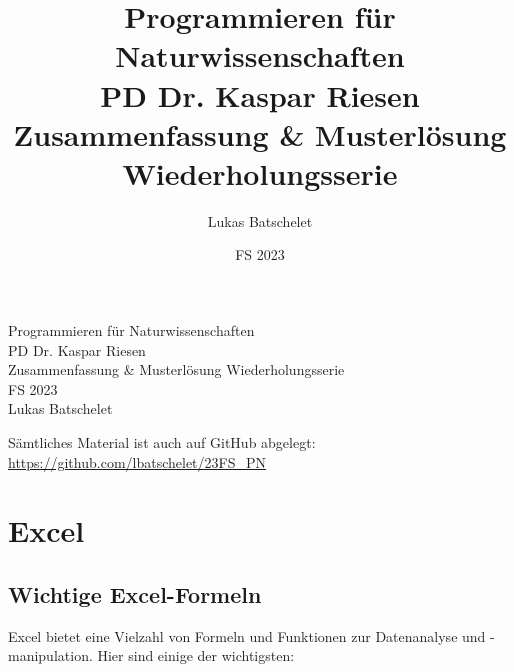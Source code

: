 \documentclass[11pt, oneside]{book}
\title{\sffamily Programmieren für Naturwissenschaften\\ \large PD Dr. Kaspar Riesen\\ \LARGE Zusammenfassung \& Musterlösung Wiederholungsserie}
\author{\sffamily Lukas Batschelet}
\date{\sffamily FS 2023}
\newcommand{\github}[1]{%
   \href{#1}{\faGithubSquare}%
}
\begin{document}
\begin{titlepage}
    \begin{center}
        {\LARGE Programmieren für Naturwissenschaften}\\[0.5cm]
        {\large PD Dr. Kaspar Riesen}\\[0.3cm]
        {\LARGE Zusammenfassung \& Musterlösung Wiederholungsserie}\\[0.5cm]
        {\large FS 2023}\\[2cm]
        {\large Lukas Batschelet}\\[0.3cm]
    \end{center}
    \vfill %
    \noindent \github{https://github.com/lbatschelet/23FS_PN} Sämtliches Material ist auch auf GitHub abgelegt: \href{https://github.com/lbatschelet/23FS_PN}{https://github.com/lbatschelet/23FS\_PN}
    \doclicenseThis
\end{titlepage}

\tableofcontents

\chapter{Excel}

\section{Wichtige Excel-Formeln}

Excel bietet eine Vielzahl von Formeln und Funktionen zur Datenanalyse und -manipulation. Hier sind einige der wichtigsten:
\end{document}
